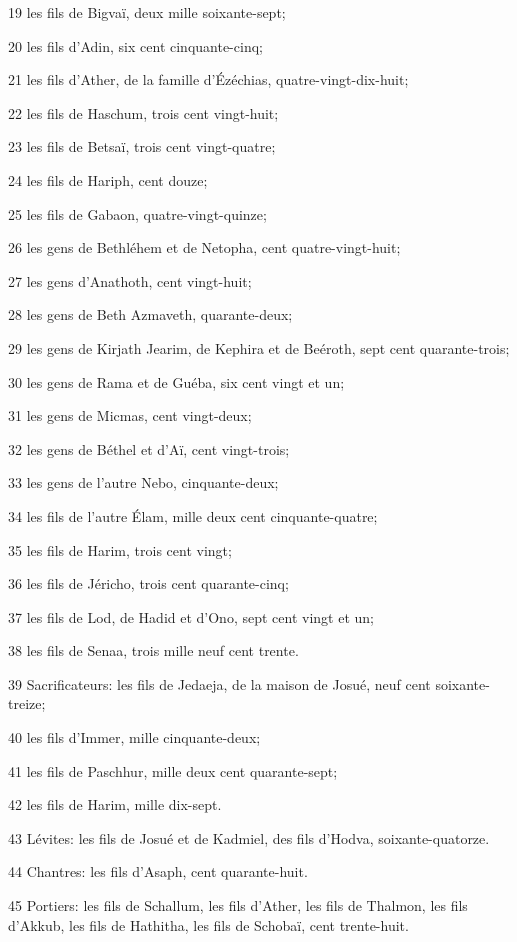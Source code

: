 \par 19 les fils de Bigvaï, deux mille soixante-sept;
\par 20 les fils d'Adin, six cent cinquante-cinq;
\par 21 les fils d'Ather, de la famille d'Ézéchias, quatre-vingt-dix-huit;
\par 22 les fils de Haschum, trois cent vingt-huit;
\par 23 les fils de Betsaï, trois cent vingt-quatre;
\par 24 les fils de Hariph, cent douze;
\par 25 les fils de Gabaon, quatre-vingt-quinze;
\par 26 les gens de Bethléhem et de Netopha, cent quatre-vingt-huit;
\par 27 les gens d'Anathoth, cent vingt-huit;
\par 28 les gens de Beth Azmaveth, quarante-deux;
\par 29 les gens de Kirjath Jearim, de Kephira et de Beéroth, sept cent quarante-trois;
\par 30 les gens de Rama et de Guéba, six cent vingt et un;
\par 31 les gens de Micmas, cent vingt-deux;
\par 32 les gens de Béthel et d'Aï, cent vingt-trois;
\par 33 les gens de l'autre Nebo, cinquante-deux;
\par 34 les fils de l'autre Élam, mille deux cent cinquante-quatre;
\par 35 les fils de Harim, trois cent vingt;
\par 36 les fils de Jéricho, trois cent quarante-cinq;
\par 37 les fils de Lod, de Hadid et d'Ono, sept cent vingt et un;
\par 38 les fils de Senaa, trois mille neuf cent trente.
\par 39 Sacrificateurs: les fils de Jedaeja, de la maison de Josué, neuf cent soixante-treize;
\par 40 les fils d'Immer, mille cinquante-deux;
\par 41 les fils de Paschhur, mille deux cent quarante-sept;
\par 42 les fils de Harim, mille dix-sept.
\par 43 Lévites: les fils de Josué et de Kadmiel, des fils d'Hodva, soixante-quatorze.
\par 44 Chantres: les fils d'Asaph, cent quarante-huit.
\par 45 Portiers: les fils de Schallum, les fils d'Ather, les fils de Thalmon, les fils d'Akkub, les fils de Hathitha, les fils de Schobaï, cent trente-huit.
